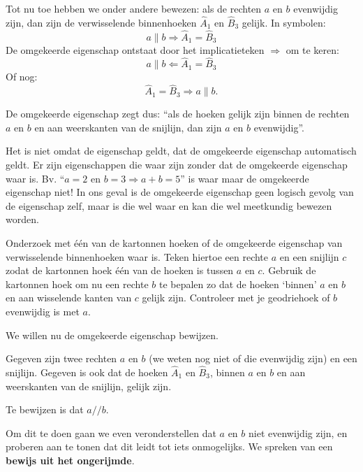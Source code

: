 
Tot nu toe hebben we onder andere bewezen: als de rechten $a$ en $b$ evenwijdig zijn, dan zijn de verwisselende binnenhoeken $\hat{A}_1$ en $\hat{B}_3$ gelijk. In symbolen:
$$a\parallel b\Rightarrow\hat{A}_1=\hat{B}_3$$
De omgekeerde eigenschap ontstaat door het implicatieteken $\Rightarrow$ om te keren:
$$a\parallel b\Leftarrow\hat{A}_1=\hat{B}_3$$
Of nog:
$$\hat{A}_1=\hat{B}_3\Rightarrow a\parallel b.$$

De omgekeerde eigenschap zegt dus: ``als de hoeken gelijk zijn binnen de rechten $a$ en $b$ en aan weerskanten van de snijlijn, dan zijn $a$ en $b$ evenwijdig''.

Het is niet omdat de eigenschap geldt, dat de omgekeerde eigenschap automatisch geldt. Er zijn eigenschappen die waar zijn zonder dat de omgekeerde eigenschap waar is. Bv. ``$a=2$ en $b=3 \Rightarrow a+b=5$'' is waar maar de omgekeerde eigenschap niet! In ons geval is de omgekeerde eigenschap geen logisch gevolg van de eigenschap zelf, maar is die wel waar en kan die wel meetkundig bewezen worden.

\begin{werktekstoef}
\setcounter{enumi}{10}  

\item{Onderzoek met één van de kartonnen hoeken of de omgekeerde eigenschap van verwisselende binnenhoeken waar is. Teken hiertoe een rechte $a$ en een snijlijn $c$ zodat de kartonnen hoek één van de hoeken is tussen $a$ en $c$. Gebruik de kartonnen hoek om nu een rechte $b$ te bepalen zo dat de hoeken ‘binnen’ $a$ en $b$ en aan wisselende kanten van $c$ gelijk zijn. Controleer met je geodriehoek of $b$ evenwijdig is met $a$.}

\end{werktekstoef}


We willen nu de omgekeerde eigenschap bewijzen.

Gegeven zijn twee rechten $a$ en $b$ (we weten nog niet of die evenwijdig zijn) en een snijlijn. Gegeven is ook dat de hoeken $\hat{A}_1$ en $\hat{B}_3$, binnen $a$ en $b$ en aan weerskanten van de snijlijn, gelijk zijn.

Te bewijzen is dat $a//b$.

Om dit te doen gaan we even veronderstellen dat $a$ en $b$ niet evenwijdig zijn, en proberen aan te tonen dat dit leidt tot iets onmogelijks. We spreken van een \textbf{bewijs uit het ongerijmde}.

